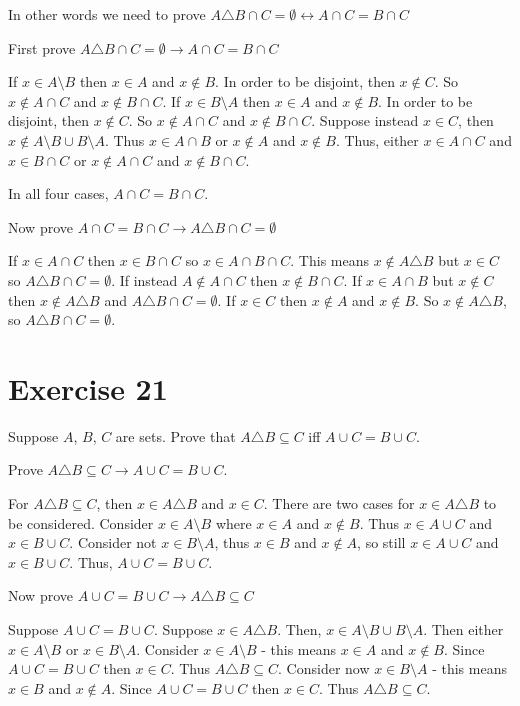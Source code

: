 \documentclass[11pt]{article}
\newcommand{\then}{\rightarrow}
\newcommand{\bicond}{\leftrightarrow}
\begin{document}
In other words we need to prove 
$A \triangle B \cap C = \emptyset \bicond A \cap C = B \cap C$

First prove $A \triangle B \cap C = \emptyset \then A \cap C = B \cap C $

If $x \in A \setminus B$ then $x \in A$ and $x \notin B$. In order to be 
disjoint, then $x \notin C$. So $x \notin A \cap C$ and $x \notin B \cap C$.
If $x \in B \setminus A$ then $x \in A$ and $x \notin B$. In order to be disjoint,
then $x \notin C$. So $x \notin A \cap C$ and $x \notin B \cap C$.
Suppose instead $x \in C$, then $x \notin A \setminus B \cup B \setminus A$.
Thus $x \in A \cap B$ or $x \notin A$ and $x \notin B$. Thus, either 
$x \in A \cap C$ and $x \in B \cap C$ or $x \notin A \cap C$ and $x \notin B \cap C$.

In all four cases, $A \cap C = B \cap C$.

Now prove $A \cap C = B \cap C \then A \triangle B \cap C = \emptyset$

If $x \in A \cap C$ then $x \in B \cap C$ so $x \in A \cap B \cap C$. This means 
$x \notin A \triangle B$ but $x \in C$ so $A \triangle B \cap C = \emptyset$.
If instead $A \notin A \cap C$ then $x \notin B \cap C$. If $x \in A \cap B$ but 
$x \notin C$ then $x \notin A \triangle B$ and $A \triangle B \cap C = \emptyset$.
If $x \in C$ then $x \notin A$ and $x \notin B$. So $x \notin A \triangle B$, 
so $A \triangle B \cap C = \emptyset$.

\section*{Exercise 21}

Suppose $A$, $B$, $C$ are sets. Prove that $A \triangle B \subseteq C$ iff 
$A \cup C = B \cup C$.

Prove $A \triangle B \subseteq C \then A \cup C = B \cup C$.

For $A \triangle B \subseteq C$, then $x \in A \triangle B$ and $x \in C$. There 
are two cases for $x \in A \triangle B$ to be considered. 
Consider $x \in A \setminus B$ where $x \in A$ and $x \notin B$. Thus 
$x \in A \cup C$ and $x \in B \cup C$. Consider not $x \in B \setminus A$, thus 
$x \in B$ and $x \notin A$, so still $x \in A \cup C$ and $x \in B \cup C$.
Thus, $A \cup C = B \cup C$.

Now prove $A \cup C = B \cup C \then A \triangle B \subseteq C$

Suppose $A \cup C = B \cup C$. Suppose $x \in A \triangle B$. Then, 
$x \in A \setminus B \cup B \setminus A$. Then either $x \in A \setminus B$
or $x \in B \setminus A$. Consider $x \in A \setminus B$ - this means 
$x \in A$ and $x \notin B$. Since $A \cup C = B \cup C$ then $x \in C$. 
Thus $A \triangle B \subseteq C$. Consider now $x \in B \setminus A$ - this means 
$x \in B$ and $x \notin A$. Since $A \cup C = B \cup C$ then $x \in C$. 
Thus $A \triangle B \subseteq C$.
\end{document}
